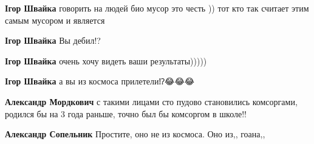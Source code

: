 \begin{itemize}
\begin{itemize}
 
\textbf{Ігор Швайка} говорить на людей био мусор это честь )) тот кто так считает этим самым мусором и является

 
\textbf{Ігор Швайка} Вы дебил!?

 
\textbf{Ігор Швайка} очень хочу видеть ваши результаты)))))

 
\textbf{Ігор Швайка} а вы из космоса прилетели⁉️😂😂😂

 
\textbf{Александр Мордкович} с такими лицами сто пудово становились комсоргами, родился бы на 3 года раньше, точно был бы комсоргом в школе!!

 
\textbf{Александр Сопельник} Простите, оно не из космоса. Оно из,, гоана,,

 

\end{itemize}
\end{itemize}
